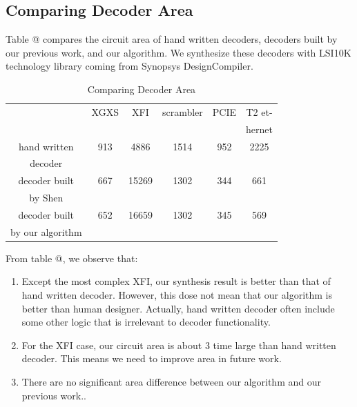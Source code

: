 \documentclass[journal]{IEEEtran}
\makeatletter
\newcommand{\Rmnum}[1]{\expandafter\@slowromancap\romannumeral #1@}
\makeatother
\begin{document}
\subsection{Comparing Decoder Area}

Table \Rmnum{4} compares the circuit area of hand written decoders,
decoders built by our previous work\cite{ShegnYuShen:iccad09},
and our algorithm.
We synthesize these decoders with LSI10K technology library coming from Synopsys DesignCompiler.

\begin{table}[!t]
\centering
\caption{Comparing Decoder Area}
\begin{tabular}{|c|c|c|c|c|c|}
\hline
&XGXS&XFI&scrambler&PCIE&T2 et-\\
&&&&&hernet\\ \hline
hand written      &913       &4886     &1514         &952   &2225          \\
decoder          &&&&&\\ \hline
decoder built     &667       &15269     &1302         &344   &661          \\
by Shen\cite{ShegnYuShen:iccad09}   &&&&&\\ \hline
decoder built     &652       &16659     &1302         &345   &569          \\
by our algorithm   &&&&&\\ \hline
\end{tabular}
\end{table}

From table \Rmnum{4},
we observe that:
\begin{enumerate}
\item Except the most complex XFI,
our synthesis result is better than that of hand written decoder.
However,
this dose not mean that our algorithm is better than human designer.
Actually,
hand written decoder often include some other logic that is irrelevant to decoder functionality.
\item For the XFI case,
our circuit area is about 3 time large than hand written decoder.
This means we need to improve area in future work.
\item There are no significant area difference between our algorithm and our previous work.\cite{ShegnYuShen:iccad09}.
\end{enumerate}
\end{document}

